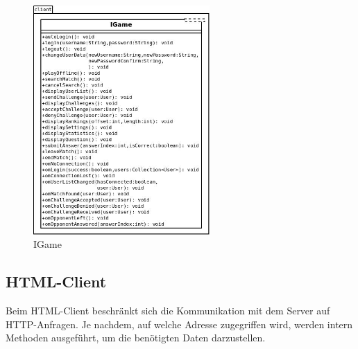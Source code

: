 \begin{figure}[H]
	\centering
	\begin{minipage}[t]{\textwidth}
		\includegraphics[width=0.6\textwidth]{Diagramme/game.jpeg}
		\caption{IGame}
		\label{IGame}
	\end{minipage}
\end{figure}

\subsection{HTML-Client}
Beim HTML-Client beschränkt sich die Kommunikation mit dem Server auf HTTP-Anfragen. Je nachdem, auf welche Adresse zugegriffen wird, werden intern Methoden ausgeführt, um die benötigten Daten darzustellen. 